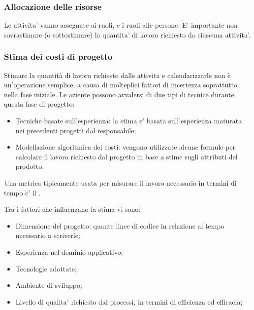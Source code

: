 
\subsubsection{Allocazione delle risorse}

Le attivita' vanno assegnate ai ruoli, e i ruoli alle persone. E' importante non
sovrastimare (o sottostimare) la quantita' di lavoro richiesto da ciascuna
attivita'.

\subsubsection{Stima dei costi di progetto}

Stimare la quantità di lavoro richiesto dalle attivita e calendarizzarle non è
un'operazione semplice, a causa di molteplici fattori di incertezza soprattutto
nella fase iniziale. Le aziente possono avvalersi di due tipi di tecnice durante
questa fase di progetto:

\begin{itemize}
  \item Tecniche basate sull'esperienza: la stima e' basata sull'esperienza
    maturata nei precedenti progetti dal responsabile;
  \item Modellazione algoritmica dei costi: vengono utilizzate alcune formule
    per calcolare il lavoro richiesto dal progetto in base a stime sugli
    attributi del prodotto;
\end{itemize}

Una \gls{metrica} tipicamente usata per misurare il lavoro necessario in termini
di tempo e' il .

Tra i fattori che influenzano la stima vi sono:

\begin{itemize}
  \item Dimensione del progetto: quante linee di codice in relazione al
    tempo necessario a scriverle;
  \item Esperienza nel dominio applicativo;
  \item Tecnologie adottate;
  \item Ambiente di sviluppo;
  \item Livello di qualita' richiesto dai processi, in termini di efficienza ed
    efficacia;
\end{itemize}

